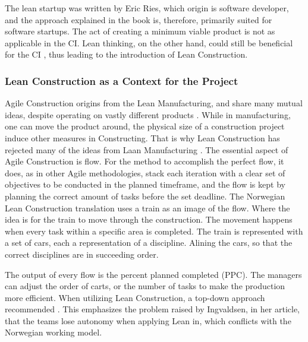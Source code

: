 The lean startup was written by Eric Ries, which origin is software developer, and the approach explained in the book is, therefore, primarily suited for software startups. The act of creating a minimum viable product is not as applicable in the CI. Lean thinking, on the other hand, could still be beneficial for the CI \cite{owen2006agile}, thus leading to the introduction of Lean Construction. 

\subsubsection{Lean Construction as a Context for the Project}\label{sec:lean_construction}
Agile Construction origins from the Lean Manufacturing, and share many mutual ideas, despite operating on vastly different products \cite{salem2006lean}. While in manufacturing, one can move the product around, the physical size of a construction project induce other measures in Constructing. That is why Lean Construction has rejected many of the ideas from Laan Manufacturing \cite{howell1999lean}. The essential aspect of Agile Construction is flow. For the method to accomplish the perfect flow, it does, as in other Agile methodologies, stack each iteration with a clear set of objectives to be conducted in the planned timeframe, and the flow is kept by planning the correct amount of tasks before the set deadline. The Norwegian Lean Construction translation uses a train as an image of the flow. Where the idea is for the train to move through the construction. The movement happens when every task within a specific area is completed. The train is represented with a set of cars, each a representation of a discipline. Alining the cars, so that the correct disciplines are in succeeding order.

The output of every flow is the percent planned completed (PPC). The managers can adjust the order of carts, or the number of tasks to make the production more efficient. When utilizing Lean Construction, a top-down approach recommended \cite{lean_i_praksis}. This emphasizes the problem raised by Ingvaldsen, in her article, that the teams lose autonomy when applying Lean in, which conflicts with the Norwegian working model.

